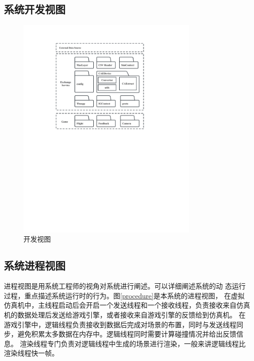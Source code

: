 \subsection{系统开发视图}
\begin{figure}[h]
    \begin{center}
        \includegraphics[width=0.8\textwidth]{pictures/devdiagram.pdf}
        \caption{开发视图}
        \label{dev}
    \end{center}
\end{figure}
\subsection{系统进程视图}
进程视图是用系统工程师的视角对系统进行阐述。可以详细阐述系统的动
态运行过程，重点描述系统运行时的行为。图\ref{procedure}是本系统的进程视图，
在虚拟仿真机中，主线程启动后会开启一个发送线程和一个接收线程，负责接收来自仿真机的数据处理后发送给游戏引擎，或者接收来自游戏引擎的反馈给到仿真机。
在游戏引擎中，逻辑线程负责接收到数据后完成对场景的布置，同时与发送线程同步，避免积累太多数据在内存中。逻辑线程同时需要计算碰撞情况并给出反馈信息。
渲染线程专门负责对逻辑线程中生成的场景进行渲染，一般来讲逻辑线程比渲染线程快一帧。

